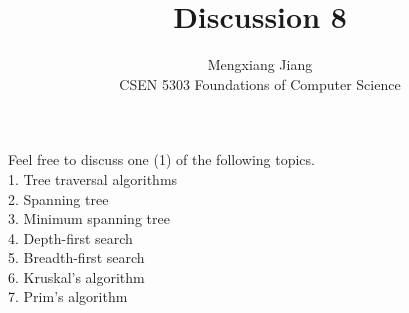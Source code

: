 \documentclass[12pt]{article}
\newenvironment{problem}[2][Problem]{\begin{trivlist}
\item[\hskip \labelsep {\bfseries #1}\hskip \labelsep {\bfseries #2.}]}{\end{trivlist}}
\begin{document}
 
 
\title{Discussion 8}%
\author{Mengxiang Jiang\\ %
CSEN 5303 Foundations of Computer Science} %
 
\maketitle

\begin{problem}{statement}
  Feel free to discuss one (1) of the following topics.\\
1. Tree traversal algorithms\\
2. Spanning tree\\
3. Minimum spanning tree\\
4. Depth-first search\\
5. Breadth-first search\\
6. Kruskal's algorithm\\
7. Prim's algorithm\\
\end{problem}
\end{document}
